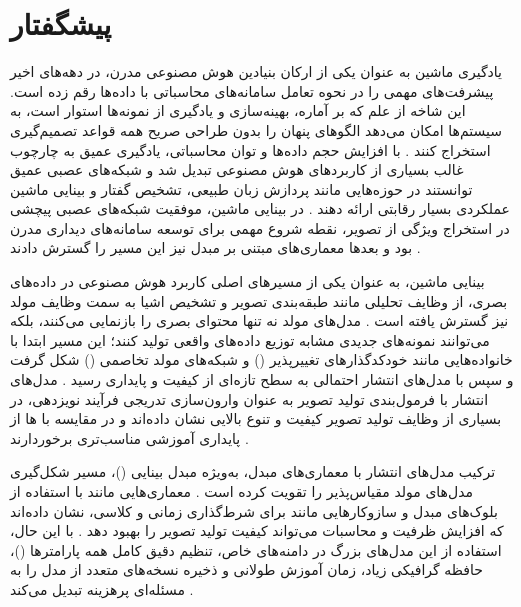 \chapter*{پیشگفتار}
%
%
\label{sec:preface}

یادگیری ماشین به عنوان یکی از ارکان بنیادین هوش مصنوعی مدرن، در دهه‌های اخیر پیشرفت‌های مهمی را در نحوه تعامل سامانه‌های محاسباتی با داده‌ها رقم زده است. این شاخه از علم که بر آماره، بهینه‌سازی و یادگیری از نمونه‌ها استوار است، به سیستم‌ها امکان می‌دهد الگوهای پنهان را بدون طراحی صریح همه قواعد تصمیم‌گیری استخراج کنند \cite{726791,Vaswani2017}. با افزایش حجم داده‌ها و توان محاسباتی، یادگیری عمیق به چارچوب غالب بسیاری از کاربردهای هوش مصنوعی تبدیل شد و شبکه‌های عصبی عمیق توانستند در حوزه‌هایی مانند پردازش زبان طبیعی، تشخیص گفتار و بینایی ماشین عملکردی بسیار رقابتی ارائه دهند \cite{Vaswani2017,Dosovitskiy2020}. در بینایی ماشین، موفقیت شبکه‌های عصبی پیچشی در استخراج ویژگی از تصویر، نقطه شروع مهمی برای توسعه سامانه‌های دیداری مدرن بود و بعدها معماری‌های مبتنی بر مبدل نیز این مسیر را گسترش دادند \cite{726791,Dosovitskiy2020}.

بینایی ماشین، به عنوان یکی از مسیرهای اصلی کاربرد هوش مصنوعی در داده‌های بصری، از وظایف تحلیلی مانند طبقه‌بندی تصویر و تشخیص اشیا به سمت وظایف مولد نیز گسترش یافته است \cite{5206848,chen2025diffusionImageGenerationSurvey}. مدل‌های مولد نه تنها محتوای بصری را بازنمایی می‌کنند، بلکه می‌توانند نمونه‌های جدیدی مشابه توزیع داده‌های واقعی تولید کنند؛ این مسیر ابتدا با خانواده‌هایی مانند خودکدگذارهای تغییرپذیر () و شبکه‌های مولد تخاصمی () شکل گرفت و سپس با مدل‌های انتشار احتمالی به سطح تازه‌ای از کیفیت و پایداری رسید \cite{Kingma2013,Goodfellow2014,0214306}. مدل‌های انتشار با فرمول‌بندی تولید تصویر به عنوان وارون‌سازی تدریجی فرآیند نویزدهی، در بسیاری از وظایف تولید تصویر کیفیت و تنوع بالایی نشان داده‌اند و در مقایسه با ها از پایداری آموزشی مناسب‌تری برخوردارند \cite{8567753,chen2025diffusionImageGenerationSurvey}.

ترکیب مدل‌های انتشار با معماری‌های مبدل، به‌ویژه مبدل بینایی ()، مسیر شکل‌گیری مدل‌های مولد مقیاس‌پذیر را تقویت کرده است \cite{Dosovitskiy2020,2212.09748}. معماری‌هایی مانند  با استفاده از بلوک‌های مبدل و سازوکارهایی مانند  برای شرط‌گذاری زمانی و کلاسی، نشان داده‌اند که افزایش ظرفیت و محاسبات می‌تواند کیفیت تولید تصویر را بهبود دهد \cite{2212.09748}. با این حال، استفاده از این مدل‌های بزرگ در دامنه‌های خاص، تنظیم دقیق کامل همه پارامترها ()، حافظه گرافیکی زیاد، زمان آموزش طولانی و ذخیره نسخه‌های متعدد از مدل را به مسئله‌ای پرهزینه تبدیل می‌کند \cite{5294562,8409325}.

